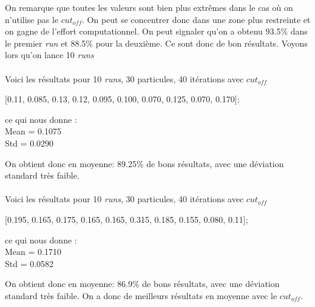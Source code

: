 \documentclass[a4paper, 11pt]{article}
\begin{document}
On remarque que toutes les valeurs sont bien plus extrêmes dans le cas où on n'utilise pas le $cut_{off}$. On peut se concentrer donc 
dans une zone plus restreinte et on gagne de l'effort computationnel. On peut signaler qu'on a obtenu 93.5\% dans le premier \textit{run}
et 88.5\% pour la deuxième. Ce sont donc de bon résultats. Voyons lors qu'on lance 10 \textit{runs}

\paragraph{}
Voici les résultats pour 10 \textit{runs}, 30 particules, 40 itérations avec $cut_{off}$
\begin{center}

[0.11, 0.085, 0.13, 0.12, 0.095, 0.100, 0.070, 0.125, 0.070, 0.170]; 
\end{center}

ce qui nous donne :\\
Mean = 	0.1075\\
Std  = 	0.0290

On obtient donc en moyenne: 89.25\% de bons résultats, avec une déviation standard très faible.

\paragraph{}
Voici les résultats pour 10 \textit{runs}, 30 particules, 40 itérations avec $cut_{off}$
\begin{center}

[0.195, 0.165, 0.175, 0.165, 0.165, 0.315, 0.185, 0.155, 0.080, 0.11];
\end{center}

ce qui nous donne :\\
Mean = 	0.1710\\
Std  = 	0.0582

On obtient donc en moyenne: 86.9\% de bons résultats, avec une déviation standard très faible.
On a donc de meilleurs résultats en moyenne avec le $cut_{off}$.

\paragraph{}
\end{document}
